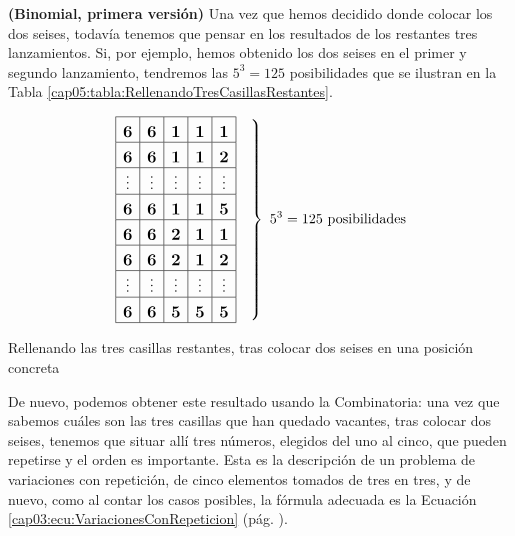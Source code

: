 \begin{Ejemplo}{\bf (Binomial, primera versión)}
    Una vez que hemos decidido donde colocar los dos seises, todavía tenemos que pensar en los resultados de los restantes tres lanzamientos. Si, por ejemplo, hemos obtenido los dos seises en el primer y segundo lanzamiento, tendremos las $5^3=125$ posibilidades que se ilustran en la Tabla \ref{cap05:tabla:RellenandoTresCasillasRestantes}.
        \begin{table}[ht]
        \begin{center}
        \[
        \left.\begin{array}{|c|c|c|c|c|}
        \hline
         \rule{0cm}{0.5cm}\mbox{\large\bf 6}&\mbox{\large\bf 6}&\mbox{\large\bf 1}&\mbox{\large\bf 1}&\mbox{\large\bf 1}\\
        \hline
        \rule{0cm}{0.5cm}\mbox{\large\bf 6}&\mbox{\large\bf 6}&\mbox{\large\bf 1}&\mbox{\large\bf 1}&\mbox{\large\bf 2}\\
        \hline
        \rule{0cm}{0.5cm}\vdots&\vdots&\vdots&\vdots&\vdots\\
        \hline
        \rule{0cm}{0.5cm}\mbox{\large\bf 6}&\mbox{\large\bf 6}&\mbox{\large\bf 1}&\mbox{\large\bf 1}&\mbox{\large\bf 5}\\
        \hline
        \rule{0cm}{0.5cm}\mbox{\large\bf 6}&\mbox{\large\bf 6}&\mbox{\large\bf 2}&\mbox{\large\bf 1}&\mbox{\large\bf 1}\\
        \hline
        \rule{0cm}{0.5cm}\mbox{\large\bf 6}&\mbox{\large\bf 6}&\mbox{\large\bf 2}&\mbox{\large\bf 1}&\mbox{\large\bf 2}\\
        \hline
        \rule{0cm}{0.5cm}\vdots&\vdots&\vdots&\vdots&\vdots\\
        \hline
        \rule{0cm}{0.5cm}\mbox{\large\bf 6}&\mbox{\large\bf 6}&\mbox{\large\bf 5}&\mbox{\large\bf 5}&\mbox{\large\bf 5}\\
        \hline
         \end{array}\quad\right\}\,\,5^3=125\mbox{ posibilidades}
         \]
        \caption{Rellenando las tres casillas restantes, tras colocar dos seises en una posición concreta}\label{cap05:tabla:RellenandoTresCasillasRestantes}
        \end{center}
        \end{table}
    De nuevo, podemos obtener este resultado usando la Combinatoria: una vez que sabemos cuáles son las tres casillas que han quedado vacantes, tras colocar dos seises, tenemos que situar allí tres números, elegidos del uno al cinco, que pueden repetirse y el orden es importante. Esta es la descripción de un problema de variaciones con repetición, de cinco elementos tomados de tres en tres, y de nuevo, como al contar los casos posibles, la fórmula adecuada es la Ecuación \ref{cap03:ecu:VariacionesConRepeticion} (pág. \pageref{cap03:ecu:VariacionesConRepeticion}).


\end{Ejemplo}
